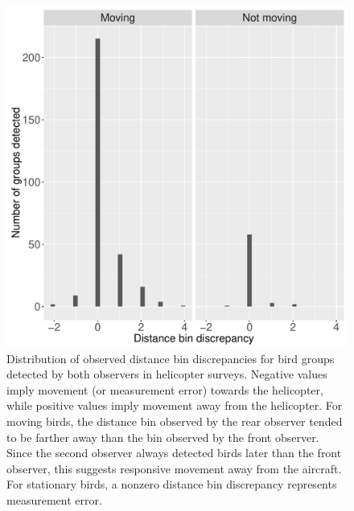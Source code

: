 \documentclass[aoas,preprint]{imsart}
\numberwithin{equation}{section}
\theoremstyle{plain}
\begin{document}
\begin{figure}
\begin{center}
\includegraphics[width=150mm]{Dist_error_hists_JABES.pdf}
\caption{Distribution of observed distance bin discrepancies for bird groups detected by both observers in helicopter surveys. Negative values imply movement (or measurement error) towards the helicopter, while positive values imply movement away from the helicopter. For moving birds, the distance bin observed by the rear observer tended to be farther away than the bin observed by the front observer.  Since the second observer always detected birds later than the front observer, this suggests responsive movement away from the aircraft. For stationary birds, a nonzero distance bin discrepancy represents measurement error.}
\label{fig:dist_hists}
\end{center}
\end{figure}
\end{document}
